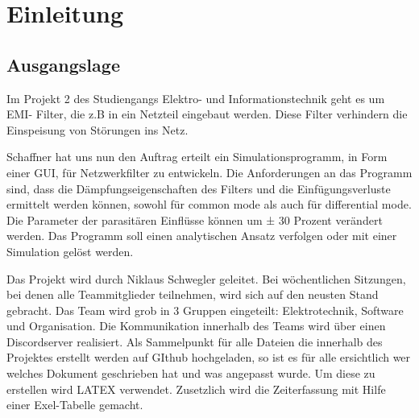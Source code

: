 \section{Einleitung}
\subsection{Ausgangslage}
Im Projekt 2 des Studiengangs Elektro- und Informationstechnik geht es um EMI- Filter, die z.B in ein Netzteil eingebaut werden. Diese Filter verhindern die Einspeisung von Störungen ins Netz.

Schaffner hat uns nun den Auftrag erteilt ein Simulationsprogramm, in Form einer GUI, für Netzwerkfilter zu entwickeln. Die Anforderungen an das Programm sind, dass die Dämpfungseigenschaften des Filters und die Einfügungsverluste ermittelt werden können, sowohl für common mode als auch für differential mode. Die Parameter der parasitären Einflüsse können um ± 30 Prozent verändert werden. Das Programm soll einen analytischen Ansatz verfolgen oder mit einer Simulation gelöst werden.
 
Das Projekt wird durch Niklaus Schwegler geleitet. Bei wöchentlichen Sitzungen, bei denen alle Teammitglieder teilnehmen, wird sich auf den neusten Stand gebracht. Das Team wird grob in 3 Gruppen eingeteilt: Elektrotechnik, Software und Organisation. Die Kommunikation innerhalb des Teams wird über einen Discordserver realisiert.  Als Sammelpunkt für alle Dateien die innerhalb des Projektes erstellt werden auf GIthub hochgeladen, so ist es für alle ersichtlich wer welches Dokument geschrieben hat und was angepasst wurde. Um diese zu erstellen wird LATEX verwendet. Zusetzlich wird die Zeiterfassung mit Hilfe einer Exel-Tabelle gemacht.   



